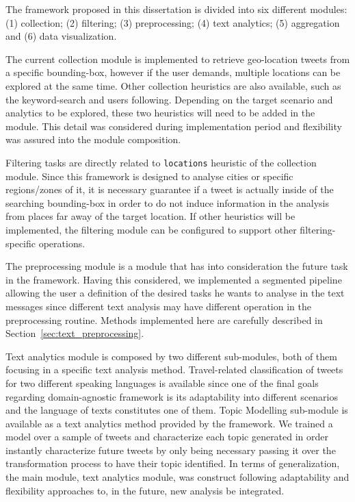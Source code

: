 The framework proposed in this dissertation is divided into six different modules: (1) collection; (2) filtering; (3) preprocessing; (4) text analytics; (5) aggregation and (6) data visualization.

The current collection module is implemented to retrieve geo-location tweets from a specific bounding-box, however if the user demands, multiple locations can be explored at the same time. Other collection heuristics are also available, such as the keyword-search and users following. Depending on the target scenario and analytics to be explored, these two heuristics will need to be added in the module. This detail was considered during implementation period and flexibility was assured into the module composition.

Filtering tasks are directly related to \texttt{locations} heuristic of the collection module. Since this framework is designed to analyse cities or specific regions/zones of it, it is necessary guarantee if a tweet is actually inside of the searching bounding-box in order to do not induce information in the analysis from places far away of the target location. If other heuristics will be implemented, the filtering module can be configured to support other filtering-specific operations.

The preprocessing module is a module that has into consideration the future task in the framework. Having this considered, we implemented a segmented pipeline allowing the user a definition of the desired tasks he wants to analyse in the text messages since different text analysis may have different operation in the preprocessing routine. Methods implemented here are carefully described in Section~\ref{sec:text_preprocessing}.

Text analytics module is composed by two different sub-modules, both of them focusing in a specific text analysis method. Travel-related classification of tweets for two different speaking languages is available since one of the final goals regarding domain-agnostic framework is its adaptability into different scenarios and the language of texts constitutes one of them. Topic Modelling sub-module is available as a text analytics method provided by the framework. We trained a model over a sample of tweets and characterize each topic generated in order instantly characterize future tweets by only being necessary passing it over the transformation process to have their topic identified.
In terms of generalization, the main module, text analytics module, was construct following adaptability and flexibility approaches to, in the future, new analysis be integrated.

